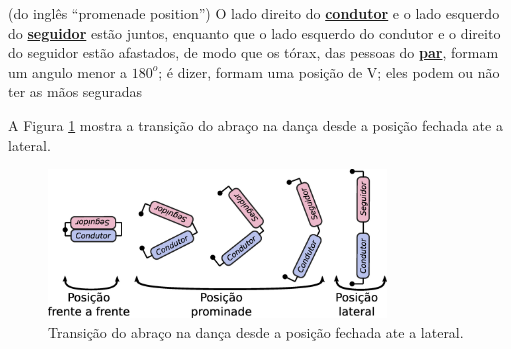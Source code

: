 \begin{definition}
\label{def:promenade-position}  (do inglês ``promenade position'') 
O lado direito do \hyperref[def:Condutor]{\textbf{condutor}} e o 
lado esquerdo do \hyperref[def:Seguidor]{\textbf{seguidor}} estão juntos,
enquanto que o lado esquerdo do condutor e o direito do seguidor estão afastados,
de modo que os tórax, das pessoas do \hyperref[def:Par]{\textbf{par}}, formam um angulo menor a $180^o$;
é dizer, formam uma posição de V;
eles podem ou não ter as mãos seguradas \cite[pp. 13, 16]{BallroomDancing1992}
\end{definition}

A Figura \ref{fig:desenhando} mostra
a transição do abraço na dança desde a posição fechada ate a lateral.

\begin{figure}[!ht]
     \centering
\includegraphics[width=0.8\textwidth]{chapters/cap-normas/desenhando.eps}
\caption{Transição do abraço na dança desde a posição fechada ate a lateral.}
\label{fig:desenhando}
\end{figure}


